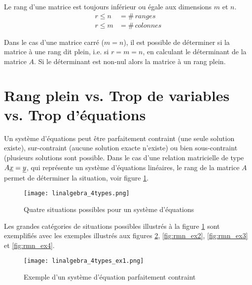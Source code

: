 Le rang d'une matrice est toujours inférieur ou égale aux dimensions $m$ et $n$.
\begin{align}
r \leq n &= \#\, ranges \\
r \leq m &= \#\, colonnes
\end{align}

Dans le cas d'une matrice carré ($m=n$), il est possible de déterminer si la matrice à une rang dit plein, i.e. si $r=m=n$, en calculant le déterminant de la matrice $A$. Si le déterminant est non-nul alors la matrice à un rang plein.  

\section{Rang plein vs. Trop de variables vs. Trop d’équations}
\label{sec:rangpleinvstrop}

Un système d'équations peut être parfaitement contraint (une seule solution existe), sur-contraint (aucune solution exacte n'existe) ou bien sous-contraint (plusieurs solutions sont possible. Dans le cas d'une relation matricielle de type $A \underline{x} = \underline{y} $, qui représente un système d’équations linéaires, le rang de la matrice $A$ permet de déterminer la situation, voir figure \ref{fig:rmn}.

\begin{figure}[htp]
	\centering
		\texttt{[image: linalgebra\_4types.png]}
	\caption{Quatre situations possibles pour un système d'équations}
	\label{fig:rmn}
\end{figure}

Les grandes catégories de situations possibles illustrés à la figure \ref{fig:rmn} sont exemplifiés avec les exemples illustrés aux figures \ref{fig:rmn_ex1}, \ref{fig:rmn_ex2}, \ref{fig:rmn_ex3} et \ref{fig:rmn_ex4}.

\begin{figure}[htp]
	\centering
		\texttt{[image: linalgebra\_4types\_ex1.png]}
	\caption{Exemple d'un système d'équation parfaitement contraint}
	\label{fig:rmn_ex1}
\end{figure}

